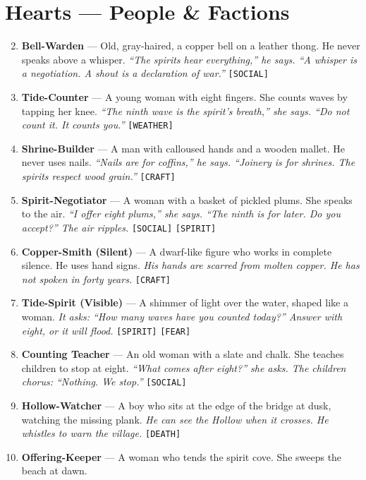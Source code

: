 \section*{Hearts --- People \& Factions}
\label{sec:aelinnel-people}
\begin{enumerate}
\setcounter{enumi}{1}
\item \textbf{Bell-Warden} --- Old, gray-haired, a copper bell on a leather thong. He never speaks above a whisper.
  \hfill \textit{``The spirits hear everything,'' he says. ``A whisper is a negotiation. A shout is a declaration of war.''} \texttt{[SOCIAL]}
\item \textbf{Tide-Counter} --- A young woman with eight fingers. She counts waves by tapping her knee.
  \hfill \textit{``The ninth wave is the spirit's breath,'' she says. ``Do not count it. It counts you.''} \texttt{[WEATHER]}
\item \textbf{Shrine-Builder} --- A man with calloused hands and a wooden mallet. He never uses nails.
  \hfill \textit{``Nails are for coffins,'' he says. ``Joinery is for shrines. The spirits respect wood grain.''} \texttt{[CRAFT]}
\item \textbf{Spirit-Negotiator} --- A woman with a basket of pickled plums. She speaks to the air.
  \hfill \textit{``I offer eight plums,'' she says. ``The ninth is for later. Do you accept?'' The air ripples.} \texttt{[SOCIAL]} \texttt{[SPIRIT]}
\item \textbf{Copper-Smith (Silent)} --- A dwarf-like figure who works in complete silence. He uses hand signs.
  \hfill \textit{His hands are scarred from molten copper. He has not spoken in forty years.} \texttt{[CRAFT]}
\item \textbf{Tide-Spirit (Visible)} --- A shimmer of light over the water, shaped like a woman.
  \hfill \textit{It asks: ``How many waves have you counted today?'' Answer with eight, or it will flood.} \texttt{[SPIRIT]} \texttt{[FEAR]}
\item \textbf{Counting Teacher} --- An old woman with a slate and chalk. She teaches children to stop at eight.
  \hfill \textit{``What comes after eight?'' she asks. The children chorus: ``Nothing. We stop.''} \texttt{[SOCIAL]}
\item \textbf{Hollow-Watcher} --- A boy who sits at the edge of the bridge at dusk, watching the missing plank.
  \hfill \textit{He can see the Hollow when it crosses. He whistles to warn the village.} \texttt{[DEATH]}
\item \textbf{Offering-Keeper} --- A woman who tends the spirit cove. She sweeps the beach at dawn.

\end{enumerate}
